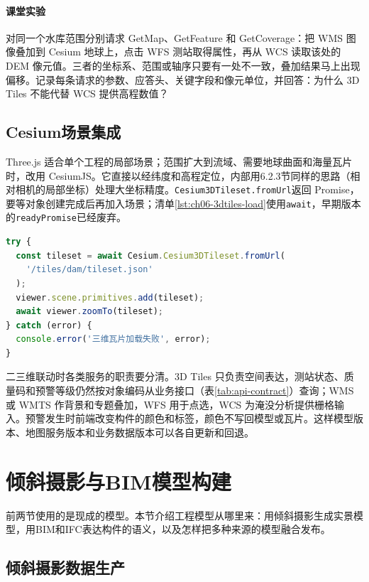 \paragraph{课堂实验}对同一个水库范围分别请求 GetMap、GetFeature 和 GetCoverage：把 WMS 图像叠加到 Cesium 地球上，点击 WFS 测站取得属性，再从 WCS 读取该处的 DEM 像元值。三者的坐标系、范围或轴序只要有一处不一致，叠加结果马上出现偏移。记录每条请求的参数、应答头、关键字段和像元单位，并回答：为什么 3D Tiles 不能代替 WCS 提供高程数值？

\subsection{Cesium场景集成}

Three.js 适合单个工程的局部场景；范围扩大到流域、需要地球曲面和海量瓦片时，改用 CesiumJS。它直接以经纬度和高程定位，内部用6.2.3节同样的思路（相对相机的局部坐标）处理大坐标精度。\texttt{Cesium3DTileset.fromUrl}返回 Promise，要等对象创建完成后再加入场景\cite{cesium3DTileset}；清单\ref{lst:ch06-3dtiles-load}使用\texttt{await}，早期版本的\texttt{readyPromise}已经废弃。

\begin{lstlisting}[label={lst:ch06-3dtiles-load},language=JavaScript,caption={Cesium 加载 3D Tiles 瓦片集}]
try {
  const tileset = await Cesium.Cesium3DTileset.fromUrl(
    '/tiles/dam/tileset.json'
  );
  viewer.scene.primitives.add(tileset);
  await viewer.zoomTo(tileset);
} catch (error) {
  console.error('三维瓦片加载失败', error);
}
\end{lstlisting}

二三维联动时各类服务的职责要分清。3D Tiles 只负责空间表达，测站状态、质量码和预警等级仍然按对象编码从业务接口（表\ref{tab:api-contract}）查询；WMS 或 WMTS 作背景和专题叠加，WFS 用于点选，WCS 为淹没分析提供栅格输入。预警发生时前端改变构件的颜色和标签，颜色不写回模型或瓦片。这样模型版本、地图服务版本和业务数据版本可以各自更新和回退。

\section{倾斜摄影与BIM模型构建}

前两节使用的是现成的模型。本节介绍工程模型从哪里来：用倾斜摄影生成实景模型，用BIM和IFC表达构件的语义，以及怎样把多种来源的模型融合发布。

\subsection{倾斜摄影数据生产}

